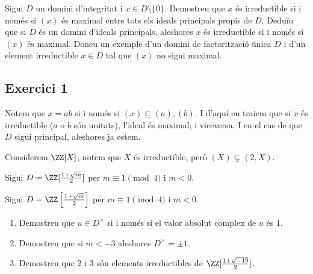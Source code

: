 \documentclass[11pt, a4paper]{article}
\begin{document}
    \begin{tcolorbox}[title=\section{FP 2 Exercici 1}]
        Sigui $D$ un domini d'integritat i $x\in D\setminus \{0\}$. Demostreu que $x$ és irreductible si i només si $(x)$ és maximal entre tots els ideals principals propis de $D$. Deduïu que si $D$ és un domini d'ideals principals, aleshores $x$ és irreductible si i només si $(x)$ és maximal. Doneu un exemple d'un domini de factorització única $D$ i d'un element irreductible $x\in D$ tal que $(x)$ no sigui maximal.
    \end{tcolorbox}
    \subsection{Exercici 1}
    Notem que $x=ab$ si i només si $(x)\subseteq (a),(b)$. I d'aquí en traiem que si $x$ és irreductible ($a$ o $b$ són unitats), l'ideal és maximal; i viceversa. I en el cas de que $D$ sigui principal, aleshores ja estem.\par
    Considerem $\ZZ[X]$, notem que $X$ és irreductible, però $(X)\subsetneq (2,X)$.
    \newpage
    \begin{tcolorbox}[title=\section{FP 2 Exercici 2}]
        Sigui $D=\ZZ[\frac{1+\sqrt{m}}{2}]$ per $m\equiv 1\pmod4$ i $m<0$.\par
        Sigui $D=\ZZ\left[\frac{1+\sqrt{m}}{2}\right]$ per $m\equiv 1\pmod4$ i $m<0$.
        \begin{enumerate}
            \item Demostreu que $u\in D^\times$ si i només si el valor absolut complex de $u$ és $1$.
            \item Demostreu que si $m<-3$ aleshores $D^\times=\pm1$.
            \item Demostreu que 2 i 3 són elements irreductibles de $\ZZ[\frac{1+\sqrt{-19}}{2}]$.
        \end{enumerate}
    \end{tcolorbox}
\end{document}
